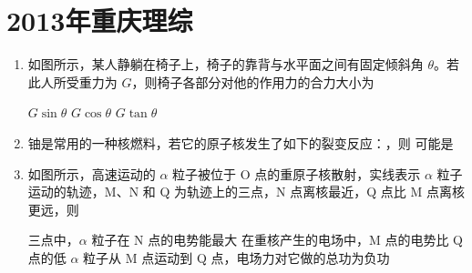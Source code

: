 \documentclass[\gkver]{gaokaozhenti}
\begin{document}
\chapter{2013年重庆理综}

\begin{enumerate}
\item
如图所示，某人静躺在椅子上，椅子的靠背与水平面之间有固定倾斜角 $\theta$。若此人所受重力为 $G$，则椅子各部分对他的作用力的合力大小为


{$G\sin\theta$}
{$G\cos\theta$}
{$G\tan\theta$}


\item
铀是常用的一种核燃料，若它的原子核发生了如下的裂变反应：，则  可能是

{}
{}
{}


\item
如图所示，高速运动的 $\alpha$ 粒子被位于 O 点的重原子核散射，实线表示 $\alpha$ 粒子运动的轨迹，M、N 和 Q 为轨迹上的三点，N 点离核最近，Q 点比 M 点离核更远，则


{三点中，$\alpha$ 粒子在 N 点的电势能最大}
{在重核产生的电场中，M 点的电势比 Q 点的低}
{$\alpha$ 粒子从 M 点运动到 Q 点，电场力对它做的总功为负功}


\end{enumerate}
\end{document}
